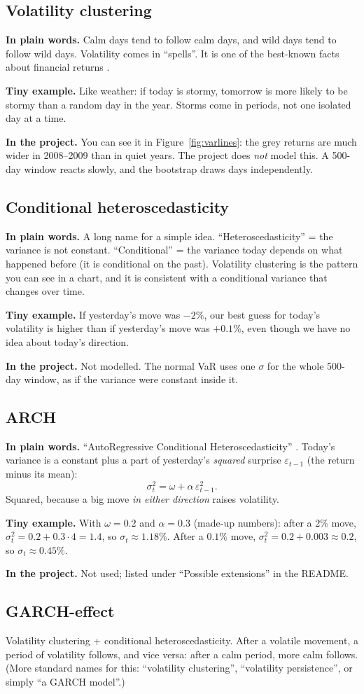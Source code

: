 \documentclass[11pt,a4paper]{article}
\newcommand{\term}[1]{\subsection{#1}}
\newcommand{\plain}{\textbf{In plain words.} }
\newcommand{\inproj}{\textbf{In the project.} }
\newcommand{\tinyex}{\textbf{Tiny example.} }
\begin{document}
\term{Volatility clustering}\label{g:cluster}
\plain Calm days tend to follow calm days, and wild days tend to follow wild
days. Volatility comes in ``spells''. It is one of the best-known facts about
financial returns \citep{cont2001}.

\tinyex Like weather: if today is stormy, tomorrow is more likely to be stormy
than a random day in the year. Storms come in periods, not one isolated day
at a time.

\inproj You can see it in Figure~\ref{fig:varlines}: the grey returns are
much wider in 2008--2009 than in quiet years. The project does
\emph{not} model this. A 500-day window reacts slowly, and the bootstrap
draws days independently.

\term{Conditional heteroscedasticity}\label{g:condhet}
\plain A long name for a simple idea. ``Heteroscedasticity'' = the variance
is not constant. ``Conditional'' = the variance today depends on what
happened before (it is conditional on the past). Volatility clustering is
the pattern you can see in a chart, and it is consistent with a conditional
variance that changes over time.

\tinyex If yesterday's move was $-2\%$, our best guess for today's volatility
is higher than if yesterday's move was $+0.1\%$, even though we have no idea
about today's direction.

\inproj Not modelled. The normal VaR uses one $\sigma$ for the whole
500-day window, as if the variance were constant inside it.

\term{ARCH}\label{g:arch}
\plain ``AutoRegressive Conditional Heteroscedasticity'' \citep{engle1982}.
Today's variance is a constant plus a part of yesterday's \emph{squared}
surprise $\varepsilon_{t-1}$ (the return minus its mean):
\[
  \sigma_t^2 = \omega + \alpha\,\varepsilon_{t-1}^2 .
\]
Squared, because a big move \emph{in either direction} raises volatility.

\tinyex With $\omega=0.2$ and $\alpha=0.3$ (made-up numbers): after a $2\%$
move, $\sigma_t^2 = 0.2 + 0.3 \cdot 4 = 1.4$, so $\sigma_t \approx 1.18\%$.
After a $0.1\%$ move, $\sigma_t^2 = 0.2 + 0.003 \approx 0.2$, so
$\sigma_t \approx 0.45\%$.

\inproj Not used; listed under ``Possible extensions'' in the README.

\term{GARCH-effect}\label{g:garch}
Volatility clustering + conditional heteroscedasticity. After a volatile
movement, a period of volatility follows, and vice versa: after a calm
period, more calm follows. (More standard names for this: ``volatility
clustering'', ``volatility persistence'', or simply ``a GARCH model''.)
\end{document}
